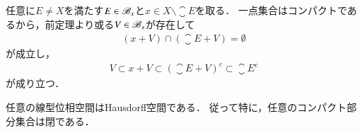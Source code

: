 	\begin{screen}
		\begin{thm}[互いに素なコンパクト集合と閉集合を覆う互いに素な開集合の存在]
			
		\end{thm}
	\end{screen}
	
	\begin{screen}
		\begin{thm}
		\end{thm}
	\end{screen}
	
	\begin{prf}
		任意に$E \neq X$を満たす$E \in \mathscr{B}_{x}$と$x \in X \backslash \closure{E}$を取る．
		一点集合はコンパクトであるから，前定理より或る$V \in \mathscr{B}_{x}$が存在して
		\begin{align}
			(x+V) \cap (\closure{E} + V) = \emptyset
		\end{align}
		が成立し，
		\begin{align}
			V \subset x+V \subset (\closure{E} + V)^c \subset \closure{E}^c
		\end{align}
		が成り立つ．
	\end{prf}
	
	\begin{screen}
		\begin{thm}
			任意の線型位相空間はHausdorff空間である．
			従って特に，任意のコンパクト部分集合は閉である．
		\end{thm}
	\end{screen}